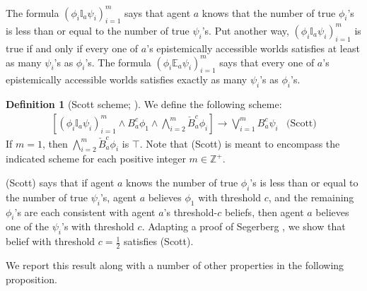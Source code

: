 \documentclass[12pt]{article}
\theoremstyle{definition}
\newtheorem{definition}[theorem]{Definition}
\newcommand{\Int}{\mathbb{Z}}  %
\begin{document}
The formula $(\phi_i\mathbb{I}_a\psi_i)_{i=1}^m$ says that agent $a$
knows that the number of true $\phi_i$'s is less than or equal to the
number of true $\psi_i$'s.  Put another way,
$(\phi_i\mathbb{I}_a\psi_i)_{i=1}^m$ is true if and only if every one
of $a$'s epistemically accessible worlds satisfies at least as many
$\psi_i$'s as $\phi_i$'s.  The formula
$(\phi_i\mathbb{E}_a\psi_i)_{i=1}^m$ says that every one of $a$'s
epistemically accessible worlds satisfies exactly as many $\psi_i$'s
as $\phi_i$'s.

\begin{definition}[Scott scheme; \cite{Sco64:JMP}]
  \label{definition:scott-schemes}
  We define the following scheme:
  \[
  \begin{array}{cl}
    \textstyle [
    (\phi_i\mathbb{I}_a\psi_i)_{i=1}^m
    \land B_a^{c} \phi_1 \land \bigwedge_{i=2}^m \check B_a^{c} \phi_i] \to
    \bigvee_{i=1}^m B_a^{c}\psi_i
    &
    \text{(Scott)}
  \end{array}
  \]
  If $m=1$, then $\bigwedge_{i=2}^m \check B_a^c\phi_i$ is $\top$.
  Note that (Scott)
  is meant to encompass the indicated scheme for each positive integer
  $m\in\Int^+$.
\end{definition}

(Scott) says that if agent $a$ knows the number of true $\phi_i$'s is
less than or equal to the number of true $\psi_i$'s, agent $a$ believes $\phi_1$
with threshold $c$, and the remaining $\phi_i$'s are each consistent
with agent $a$'s threshold-$c$ beliefs, then agent $a$ believes one of
the $\psi_i$'s with threshold $c$.  Adapting a proof of Segerberg
\cite{Segerberg1971:qpiams}, we show that belief with threshold
$c=\frac12$ satisfies (Scott).

We report this result along with a number of other properties
in the following proposition.
\end{document}
